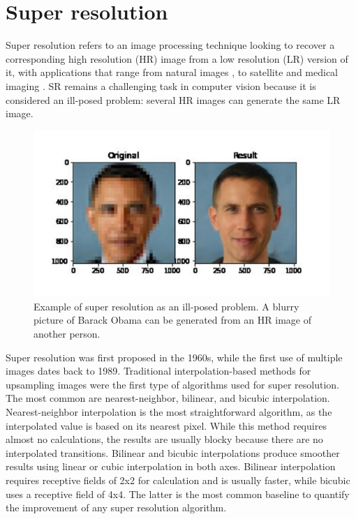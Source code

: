 \section{Super resolution} \label{sec:SR}

    Super resolution refers to an image processing technique looking to recover a corresponding high resolution (HR) image from a low resolution (LR) version of it, with applications that range from natural images \cite{zeyde2010single,martin2001database}, to satellite \cite{valsesia2021permutation} and medical imaging \cite{bashir2021comprehensive}. SR remains a challenging task in computer vision because it is considered an ill-posed problem: several HR images can generate the same LR image. 

       \begin{figure}[H]
            \centering
            \includegraphics[width=\textwidth]{Includes/2-SR-ill-posed.jpg}
            \caption{Example of super resolution as an ill-posed problem. A blurry picture of Barack Obama can be generated from an HR image of another person.}
            \label{fig:2-SR-ill-posed}
        \end{figure}
    
    Super resolution was first proposed in the 1960s, while the first use of multiple images dates back to 1989. 
    Traditional interpolation-based methods for upsampling images were the first type of algorithms used for super resolution.
    The most common are nearest-neighbor, bilinear, and bicubic interpolation.
    Nearest-neighbor interpolation is the most straightforward algorithm, as the interpolated value is based on its nearest pixel. 
    While this method requires almost no calculations, the results are usually blocky because there are no interpolated transitions.
    Bilinear and bicubic interpolations produce smoother results using linear or cubic interpolation in both axes. Bilinear interpolation requires receptive fields of 2x2 for calculation and is usually faster, while bicubic uses a receptive field of 4x4. 
    The latter is the most common baseline to quantify the improvement of any super resolution algorithm. 


